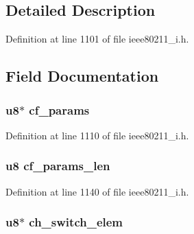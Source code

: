 \subsection{Detailed Description}


Definition at line 1101 of file ieee80211\-\_\-i.\-h.



\subsection{Field Documentation}
\hypertarget{structieee802__11__elems_ae663298f76d3de3852deeaa305626d62}{
\subsubsection[{cf\-\_\-params}]{\setlength{\rightskip}{0pt plus 5cm}u8$\ast$ cf\-\_\-params}}\label{structieee802__11__elems_ae663298f76d3de3852deeaa305626d62}


Definition at line 1110 of file ieee80211\-\_\-i.\-h.

\hypertarget{structieee802__11__elems_ab9e1ceea5f509efc44108625fcd62d2d}{
\subsubsection[{cf\-\_\-params\-\_\-len}]{\setlength{\rightskip}{0pt plus 5cm}u8 cf\-\_\-params\-\_\-len}}\label{structieee802__11__elems_ab9e1ceea5f509efc44108625fcd62d2d}


Definition at line 1140 of file ieee80211\-\_\-i.\-h.

\hypertarget{structieee802__11__elems_a38ba879334b0542a7b1ee9e0e4a6c711}{
\subsubsection[{ch\-\_\-switch\-\_\-elem}]{\setlength{\rightskip}{0pt plus 5cm}u8$\ast$ ch\-\_\-switch\-\_\-elem}}\label{structieee802__11__elems_a38ba879334b0542a7b1ee9e0e4a6c711}


